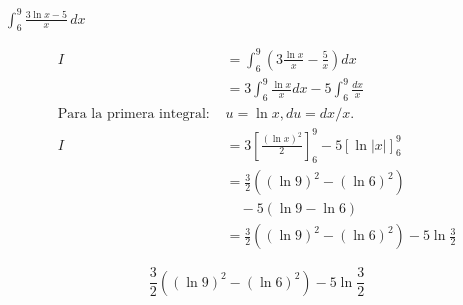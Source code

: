 $\displaystyle \int_{6}^{9}\frac{3\ln x-5}{x}\,dx$

\nopagebreak
\begin{align*}
I &= \int_{6}^{9} \left( 3 \frac{\ln x}{x} - \frac{5}{x} \right) dx \\
&= 3 \int_{6}^{9} \frac{\ln x}{x} dx - 5 \int_{6}^{9} \frac{dx}{x} \\
\text{Para la primera integral: } & u=\ln x, du=dx/x. \\
I &= 3 \left[ \frac{(\ln x)^2}{2} \right]_{6}^{9} - 5 \left[ \ln|x| \right]_{6}^{9} \\
&= \frac{3}{2} ((\ln 9)^2 - (\ln 6)^2) \\
&\quad - 5 (\ln 9 - \ln 6) \\
&= \frac{3}{2} ((\ln 9)^2 - (\ln 6)^2) - 5 \ln \frac{3}{2}
\end{align*}

\[
\boxed{\displaystyle \frac{3}{2} ((\ln 9)^2 - (\ln 6)^2) - 5 \ln \frac{3}{2}}
\]
